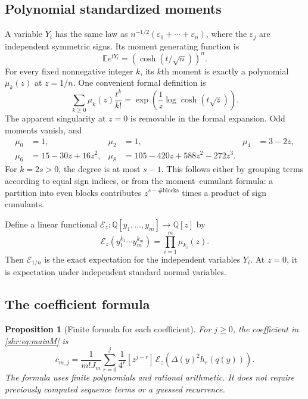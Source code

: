 \documentclass[11pt,letterpaper]{article}
\numberwithin{equation}{section}
\newtheorem{proposition}[theorem]{Proposition}
\theoremstyle{definition}
\newcommand{\E}{\mathbb E}
\newcommand{\Q}{\mathbb Q}
\newcommand{\1}{\mathbf 1}
\newcommand{\eps}{\varepsilon}
\begin{document}
\subsection{Polynomial standardized moments}
A variable $Y_i$ has the same law as
$n^{-1/2}(\eps_1+\cdots+\eps_n)$, where the $\eps_j$ are independent
symmetric signs. Its moment generating function is
\begin{equation}
 \E e^{tY_i}=
 \left(\cosh(t/\sqrt n)\right)^n.
 \label{shr:eq:mgf}
\end{equation}
For every fixed nonnegative integer $k$, its $k$th moment is exactly a
polynomial $\mu_k(z)$ at $z=1/n$. One convenient formal definition is
\begin{equation}
 \sum_{k\ge0}\mu_k(z)\frac{t^k}{k!}
 =\exp\left(\frac1z\log\cosh(t\sqrt z)\right).
 \label{shr:eq:moments}
\end{equation}
The apparent singularity at $z=0$ is removable in the formal expansion.
Odd moments vanish, and
\begin{align}
 \mu_0&=1,&\mu_2&=1,&\mu_4&=3-2z,\\
 \mu_6&=15-30z+16z^2,&
 \mu_8&=105-420z+588z^2-272z^3.
 \label{shr:eq:momentexamples}
\end{align}
For $k=2s>0$, the degree is at most $s-1$. This follows either by grouping
terms according to equal sign indices, or from the moment--cumulant formula:
a partition into even blocks contributes
$z^{s-\#\text{blocks}}$ times a product of sign cumulants.

Define a linear functional $\mathcal E_z:\Q[y_1,\ldots,y_m]\to\Q[z]$ by
\begin{equation}
 \mathcal E_z(y_1^{k_1}\cdots y_m^{k_m})=
 \prod_{i=1}^m\mu_{k_i}(z).
 \label{shr:eq:Ez}
\end{equation}
Then $\mathcal E_{1/n}$ is the exact expectation for the independent
variables $Y_i$. At $z=0$, it is expectation under independent standard
normal variables.

\subsection{The coefficient formula}
\begin{proposition}[Finite formula for each coefficient]\label{shr:prop:formula}
For $j\ge0$, the coefficient in \eqref{shr:eq:mainM} is
\begin{equation}
 \boxed{\displaystyle
 c_{m,j}=\frac1{m!J_m}
 \sum_{r=0}^{j}\frac1{4^r}
 [z^{j-r}]\,\mathcal E_z\!\left(\Delta(y)^2h_r(q(y))\right).}
 \label{shr:eq:coefficientformula}
\end{equation}
The formula uses finite polynomials and rational arithmetic. It does not
require previously computed sequence terms or a guessed recurrence.
\end{proposition}
\end{document}
